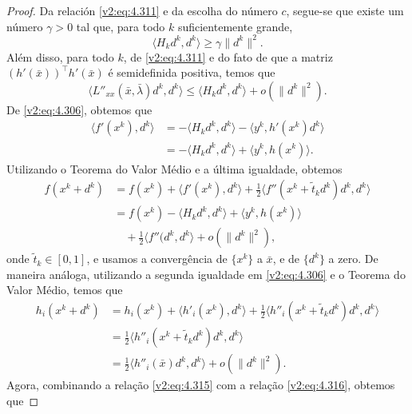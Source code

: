 \begin{proof}
    Da relación \eqref{v2:eq:4.311} e da escolha do número $c$, segue-se que existe um número $\gamma > 0$ tal que, para todo $k$ suficientemente grande,
    \begin{equation}
        \langle H_k d^k, d^k \rangle \ge \gamma \|d^k\|^2.
        \label{v2:eq:4.313}
    \end{equation}
    Além disso, para todo $k$, de \eqref{v2:eq:4.311} e do fato de que a matriz $(h'(\bar{x}))^\top h'(\bar{x})$ é semidefinida positiva, temos que
    \begin{equation}
        \langle L''_{xx}(\bar{x}, \bar{\lambda}) d^k, d^k \rangle \le \langle H_k d^k, d^k \rangle + o(\|d^k\|^2).
        \label{v2:eq:4.314}
    \end{equation}
    De \eqref{v2:eq:4.306}, obtemos que
    \begin{align}
        \langle f'(x^k), d^k \rangle &= -\langle H_k d^k, d^k \rangle - \langle y^k, h'(x^k)d^k \rangle \nonumber \\
        &= -\langle H_k d^k, d^k \rangle + \langle y^k, h(x^k) \rangle.
        \label{v2:eq:4.314b}
    \end{align}
    Utilizando o Teorema do Valor Médio e a última igualdade, obtemos
    \begin{align}
        f(x^k + d^k) &= f(x^k) + \langle f'(x^k), d^k \rangle + \frac{1}{2}\langle f''(x^k + \tilde{t}_k d^k)d^k, d^k \rangle \nonumber \\
        &= f(x^k) - \langle H_k d^k, d^k \rangle + \langle y^k, h(x^k) \rangle \nonumber \\
        &\quad + \frac{1}{2}\langle f''(d^k, d^k \rangle + o(\|d^k\|^2),
        \label{v2:eq:4.315}
    \end{align}
    onde $\tilde{t}_k \in [0, 1]$, e usamos a convergência de $\{x^k\}$ a $\bar{x}$, e de $\{d^k\}$ a zero.
    De maneira análoga, utilizando a segunda igualdade em \eqref{v2:eq:4.306} e o Teorema do Valor Médio, temos que
    \begin{align}
        h_i(x^k + d^k) &= h_i(x^k) + \langle h'_i(x^k), d^k \rangle + \frac{1}{2}\langle h''_i(x^k + \tilde{t}_k d^k)d^k, d^k \rangle \nonumber \\
        &= \frac{1}{2}\langle h''_i(x^k + \tilde{t}_k d^k)d^k, d^k \rangle \nonumber \\
        &= \frac{1}{2}\langle h''_i(\bar{x})d^k, d^k \rangle + o(\|d^k\|^2).
        \label{v2:eq:4.316}
    \end{align}
    Agora, combinando a relação \eqref{v2:eq:4.315} com a relação \eqref{v2:eq:4.316}, obtemos que

\end{proof}
